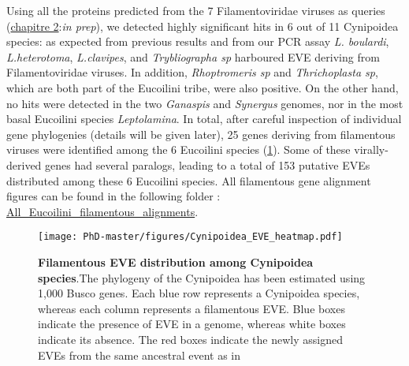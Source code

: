 Using all the proteins predicted from the 7 Filamentoviridae viruses as queries (\hyperref[sec:chap2]{chapitre 2}:\textit{in prep}), we detected highly significant hits in 6 out of 11 Cynipoidea species: as expected from previous results and from our PCR assay \textit{L. boulardi}, \textit{L.heterotoma}, \textit{L.clavipes}, and \textit{Trybliographa sp} harboured EVE deriving from Filamentoviridae viruses. In addition, \textit{Rhoptromeris sp}  and \textit{Thrichoplasta sp}, which are both part of the Eucoilini tribe, were also positive.  
On the other hand, no hits were detected in the two \textit{Ganaspis} and \textit{Synergus} genomes, nor in the most basal Eucoilini species \textit{Leptolamina}. In total, after careful inspection of individual gene phylogenies (details will be given later), 25 genes deriving from filamentous viruses were identified among the 6 Eucoilini species (\figurename{\ref{figure:Cynipoidea_EVE_heatmap}}). Some of these virally-derived genes had several paralogs, leading to a total of 153 putative EVEs distributed among these 6 Eucoilini species. All filamentous gene alignment figures can be found in the following folder : \href{https://github.com/BenjaminGuinet/PhD_defense/tree/main/Supplementary_paper3/All_Eucoilini_filamentous_alignments}{All\_Eucoilini\_filamentous\_alignments}. 


\begin{figure}[!htpbt]
\texttt{[image: PhD-master/figures/Cynipoidea\_EVE\_heatmap.pdf]}\centering
\caption[Paper3:Filamentous EVEs distribution in Cynipoideai]{\textbf{Filamentous EVE distribution among Cynipoidea species}.The phylogeny of the Cynipoidea has been estimated using 1,000 Busco genes.
Each blue row represents a Cynipoidea species, whereas each column represents a filamentous EVE.
Blue boxes indicate the presence of EVE in a genome, whereas white boxes indicate its absence. The red boxes indicate the newly assigned EVEs from the same ancestral event as in \cite{di_giovanni_behavior-manipulating_2020}}
\label{figure:Cynipoidea_EVE_heatmap}
\end{figure}




